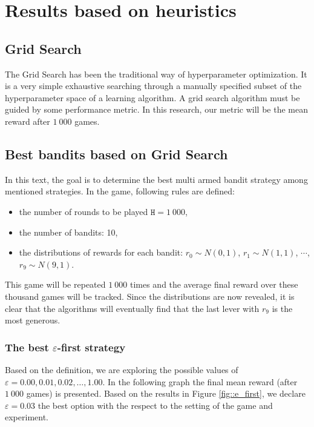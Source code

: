\documentclass[11pt,american,czech]{article}
\begin{document}
	
\newpage
\section*{Results based on heuristics}

	\subsection*{Grid Search}
	The Grid Search has been the traditional way of hyperparameter optimization. It is a very simple exhaustive searching through a manually specified subset of the hyperparameter space of a learning algorithm. A grid search algorithm must be guided by some performance metric. In this research, our metric will be the mean reward after $1~000$ games. 
	
	\subsection*{Best bandits based on Grid Search}

In this text, the goal is to determine the best multi armed bandit strategy among mentioned strategies. In the game, following rules are defined:
\begin{itemize}
	\item the number of rounds to be played $\mathtt{H}=1~000$,
	\item the number of bandits: 10,
	\item the distributions of rewards for each bandit:
		\subitem $r_0\sim N(0,1)$,
		\subitem $r_1\sim N(1,1)$,
		\subitem $\cdots$,
		\subitem $r_9\sim N(9,1)$.
\end{itemize}
This game will be repeated $1~000$ times and the average final reward over these thousand games will be tracked. Since the distributions are now revealed, it is clear that the algorithms will eventually find that the last lever with $r_9$ is the most generous.

\subsubsection*{The best $\varepsilon$-first strategy}
Based on the definition, we are exploring the possible values of $\varepsilon=0.00, 0.01, 0.02,\dots, 1.00.$ In the following graph the final mean reward (after $1~000$ games) is presented. Based on the results in Figure \ref{fig::e_first}, we declare $\varepsilon = 0.03 $ the best option with the respect to the setting of the game and experiment.
\end{document}
